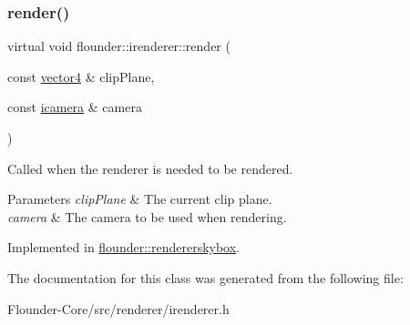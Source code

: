 \subsubsection{\texorpdfstring{render()}{render()}}
{\footnotesize\ttfamily virtual void flounder\+::irenderer\+::render (\begin{DoxyParamCaption}\item[{const \hyperlink{classflounder_1_1vector4}{vector4} \&}]{clip\+Plane,  }\item[{const \hyperlink{classflounder_1_1icamera}{icamera} \&}]{camera }\end{DoxyParamCaption})\hspace{0.3cm}{\ttfamily [pure virtual]}}



Called when the renderer is needed to be rendered. 


\begin{DoxyParams}{Parameters}
{\em clip\+Plane} & The current clip plane. \\
\hline
{\em camera} & The camera to be used when rendering. \\
\hline
\end{DoxyParams}


Implemented in \hyperlink{classflounder_1_1rendererskybox_a66714b2e580cd64a30e92d78a0260a33}{flounder\+::rendererskybox}.



The documentation for this class was generated from the following file\+:\begin{DoxyCompactItemize}
\item 
Flounder-\/\+Core/src/renderer/irenderer.\+h\end{DoxyCompactItemize}
